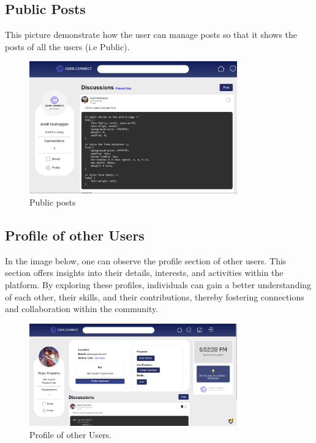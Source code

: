 \subsection{Public Posts}
This picture demonstrate how the user can manage posts so that it shows the posts of all the users (i.e Public).
\begin{figure}[H]
    \centering
    \includegraphics[width=0.8\textwidth]{Outcome-ss/public-posts.png}
    \caption{Public posts}
    \label{fig:Public posts}
\end{figure}

\subsection{Profile of other Users}
In the image below, one can observe the profile section of other users. This section offers insights into their details, interests, and activities within the platform. By exploring these profiles, individuals can gain a better understanding of each other, their skills, and their contributions, thereby fostering connections and collaboration within the community.
\begin{figure}[H]
    \centering
    \includegraphics[width=0.8\textwidth]{Outcome-ss/other-user-profile.png}
    \caption{Profile of other Users.}
    \label{fig:Profile of other Users}
\end{figure}
